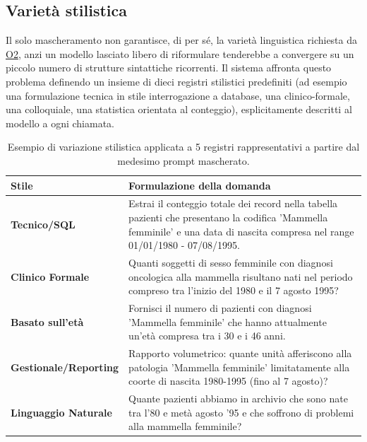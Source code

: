 \documentclass[12pt,a4paper,openright,twoside]{book}
\begin{document}
\subsection{Varietà stilistica}

Il solo mascheramento non garantisce, di per sé, la varietà linguistica
richiesta da \hyperref[obj:O2]{O2}, anzi un modello lasciato libero di
riformulare tenderebbe a convergere su un piccolo numero di strutture
sintattiche ricorrenti. Il sistema affronta questo problema definendo un insieme
di dieci registri stilistici predefiniti (ad esempio una formulazione tecnica in
stile interrogazione a database, una clinico-formale, una colloquiale, una
statistica orientata al conteggio), esplicitamente descritti al modello a ogni
chiamata.

\begin{table}[H]
    \centering
    \small
    \renewcommand{\arraystretch}{1.2}
    \begin{tabularx}{\textwidth}{>{\bfseries}l X}
        \toprule
        Stile                & Formulazione della domanda                        \\
        \midrule
        Tecnico/SQL          & Estrai il conteggio totale dei record nella
        tabella pazienti che presentano la codifica 'Mammella femminile' e una
        data di nascita compresa nel range 01/01/1980 - 07/08/1995.              \\
        Clinico Formale      & Quanti soggetti di sesso femminile con diagnosi
        oncologica alla mammella risultano nati nel periodo compreso tra
        l'inizio del 1980 e il 7 agosto 1995?                                    \\
        Basato sull'età      & Fornisci il numero di pazienti con diagnosi
        'Mammella femminile' che hanno attualmente un'età compresa tra i 30 e i
        46 anni.                                                                 \\
        Gestionale/Reporting & Rapporto volumetrico: quante unità afferiscono
        alla patologia 'Mammella femminile' limitatamente alla coorte di nascita
        1980-1995 (fino al 7 agosto)?                                            \\
        Linguaggio Naturale  & Quante pazienti abbiamo in archivio che sono nate
        tra l'80 e metà agosto '95 e che soffrono di problemi alla mammella
        femminile?                                                               \\
        \bottomrule
    \end{tabularx}
    \caption{Esempio di variazione stilistica applicata a 5 registri rappresentativi a partire dal medesimo prompt mascherato.}
    \label{tab:style-variations-compact}
\end{table}
\end{document}
